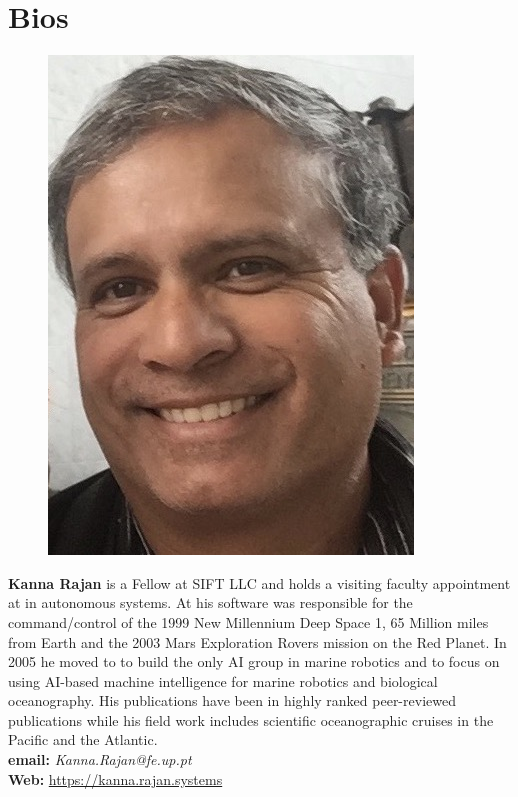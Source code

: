 \section{Bios}
\label{sec:bios}

\parbox{6.5in}{
\begin{figure} %
    \vspace{-\intextsep}
    \hspace*{-.35\columnsep}\includegraphics[scale=0.4]{fig/KRajan.jpg}
\end{figure}
\textbf{Kanna Rajan} is a Fellow at SIFT LLC and holds a visiting
faculty appointment at \univ in autonomous systems. At \nas his
software was responsible for the command/control of the 1999 New
Millennium Deep Space 1, 65 Million miles from Earth and the 2003 Mars
Exploration Rovers mission on the Red Planet. In 2005 he moved to \mba
to build the only AI group in marine robotics and to focus on using
AI-based machine intelligence for marine robotics and biological
oceanography. His publications have been in highly ranked
peer-reviewed publications while his field work includes scientific
oceanographic cruises in the Pacific and the Atlantic.\\

\textbf{email: }\emph{Kanna.Rajan@fe.up.pt}\\
\textbf{Web: }\url{https://kanna.rajan.systems}
}

